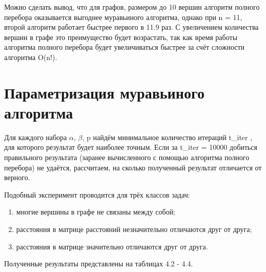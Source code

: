Можно сделать вывод, что для графов, размером до 10 вершин алгоритм полного перебора оказывается выгоднее муравьиного алгоритма, однако при n = 11, второй алгоритм
работает быстрее первого в 11.9 раз. С увеличением количества вершин в графе это преимущество будет возрастать, так как время работы алгоритма полного перебора будет увеличиваться быстрее за счёт сложности алгоритма O(n!).

\section{Параметризация муравьиного алгоритма}

Для каждого набора $\alpha$, $\beta$, p найдём минимальное количество итераций t\_iter , для которого результат будет наиболее точным. Если за t\_iter = 10000 добиться правильного результата (заранее вычисленного с помощью алгоритма полного перебора) не удаётся, рассчитаем, на сколько полученный результат отличается от верного.

Подобный эксперимент проводится для трёх классов задач:
\begin{enumerate}
	\item многие вершины в графе не связаны между собой;
	\item расстояния в матрице расстояний незначительно отличаются друг от друга;
	\item расстояния в матрице значительно отличаются друг от друга.
\end{enumerate}
Полученные результаты представлены на таблицах 4.2 - 4.4.

